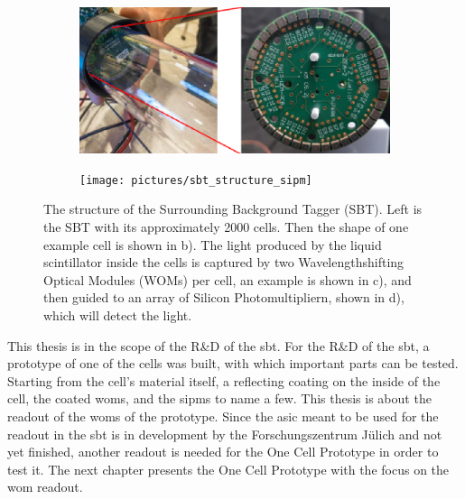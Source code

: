 \begin{figure}
\begin{subfigure}[b]{0.25\textwidth}
	\end{subfigure}
	\begin{subfigure}[b]{0.25\textwidth}
		\centering
		\includegraphics[width=.9\textwidth]{pictures/sbt_structure_wom}
		\label{fig:sbt_structure}
	\end{subfigure}
	\begin{subfigure}[b]{0.25\textwidth}
		\centering
		\texttt{[image: pictures/sbt\_structure\_sipm]}
		\label{fig:sbt_structure}
	\end{subfigure}
	\caption[Overview of the Surrounding Background Tagger]{The structure of the Surrounding Background Tagger (SBT). Left is the SBT with its approximately 2000 cells. Then the shape of one example cell is shown in b). The light produced by the liquid scintillator inside the cells is captured by two Wavelengthshifting Optical Modules (WOMs) per cell, an example is shown in c), and then guided to an array of Silicon Photomultipliern, shown in d), which will detect the light.}
	\label{fig:sbt}
\end{figure}

This thesis is in the scope of the R\&D of the \ac{sbt}.
For the R\&D of the \ac{sbt}, a prototype of one of the cells was built, with which important parts can be tested.
Starting from the cell's material itself, a reflecting coating on the inside of the cell, the coated \acp{wom}, and the \acp{sipm} to name a few.
This thesis is about the readout of the \acp{wom} of the prototype.
Since the \ac{asic} meant to be used for the readout in the \ac{sbt} is in development by the Forschungszentrum Jülich and not yet finished, another readout is needed for the One Cell Prototype in order to test it.
The next chapter presents the One Cell Prototype with the focus on the \ac{wom} readout.
